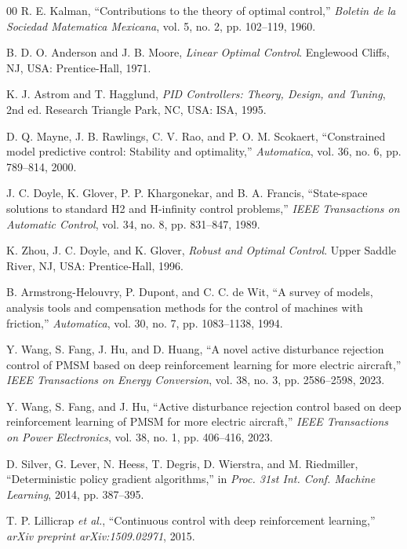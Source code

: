 \documentclass[conference]{IEEEtran}
\begin{document}
\begin{thebibliography}{00}
R. E. Kalman, ``Contributions to the theory of optimal control,'' \emph{Boletin de la Sociedad Matematica Mexicana}, vol. 5, no. 2, pp. 102--119, 1960.

B. D. O. Anderson and J. B. Moore, \emph{Linear Optimal Control}. Englewood Cliffs, NJ, USA: Prentice-Hall, 1971.

K. J. Astrom and T. Hagglund, \emph{PID Controllers: Theory, Design, and Tuning}, 2nd ed. Research Triangle Park, NC, USA: ISA, 1995.

D. Q. Mayne, J. B. Rawlings, C. V. Rao, and P. O. M. Scokaert, ``Constrained model predictive control: Stability and optimality,'' \emph{Automatica}, vol. 36, no. 6, pp. 789--814, 2000.

J. C. Doyle, K. Glover, P. P. Khargonekar, and B. A. Francis, ``State-space solutions to standard H2 and H-infinity control problems,'' \emph{IEEE Transactions on Automatic Control}, vol. 34, no. 8, pp. 831--847, 1989.

K. Zhou, J. C. Doyle, and K. Glover, \emph{Robust and Optimal Control}. Upper Saddle River, NJ, USA: Prentice-Hall, 1996.

B. Armstrong-Helouvry, P. Dupont, and C. C. de Wit, ``A survey of models, analysis tools and compensation methods for the control of machines with friction,'' \emph{Automatica}, vol. 30, no. 7, pp. 1083--1138, 1994.

Y. Wang, S. Fang, J. Hu, and D. Huang, ``A novel active disturbance rejection control of PMSM based on deep reinforcement learning for more electric aircraft,'' \emph{IEEE Transactions on Energy Conversion}, vol. 38, no. 3, pp. 2586--2598, 2023.

Y. Wang, S. Fang, and J. Hu, ``Active disturbance rejection control based on deep reinforcement learning of PMSM for more electric aircraft,'' \emph{IEEE Transactions on Power Electronics}, vol. 38, no. 1, pp. 406--416, 2023.

D. Silver, G. Lever, N. Heess, T. Degris, D. Wierstra, and M. Riedmiller, ``Deterministic policy gradient algorithms,'' in \emph{Proc. 31st Int. Conf. Machine Learning}, 2014, pp. 387--395.

T. P. Lillicrap \emph{et al.}, ``Continuous control with deep reinforcement learning,'' \emph{arXiv preprint arXiv:1509.02971}, 2015.


\end{thebibliography}
\end{document}

